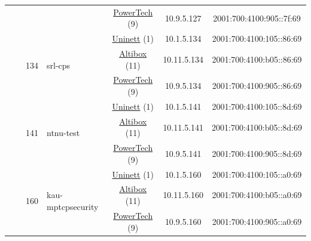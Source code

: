 \begin{small}
\begin{center}
\begin{longtable}{|c|c|c|c|c|c|c|c|}
  &  &  &  & \multicolumn{2}{|c|}{\tiny{\href{http://www.powertech.no}{PowerTech} (9)}} & \tiny{10.9.5.127} & \tiny{2001:700:4100:905::7f:69} \\* \cline{3-3}\cline{4-4}\cline{5-5}\cline{6-6}\cline{7-7}\cline{8-8}
  &  & \multirow{3}{*}{\tiny{134}} & \multicolumn{1}{|l|}{\multirow{3}{*}{\tiny{srl-cps}}} & \multicolumn{2}{|c|}{\tiny{\href{https://www.uninett.no}{Uninett} (1)}} & \tiny{10.1.5.134} & \tiny{2001:700:4100:105::86:69} \\* \cline{5-5}\cline{6-6}\cline{7-7}\cline{8-8}
  &  &  &  & \multicolumn{2}{|c|}{\tiny{\href{https://www.altibox.no}{Altibox} (11)}} & \tiny{10.11.5.134} & \tiny{2001:700:4100:b05::86:69} \\* \cline{5-5}\cline{6-6}\cline{7-7}\cline{8-8}
  &  &  &  & \multicolumn{2}{|c|}{\tiny{\href{http://www.powertech.no}{PowerTech} (9)}} & \tiny{10.9.5.134} & \tiny{2001:700:4100:905::86:69} \\* \cline{3-3}\cline{4-4}\cline{5-5}\cline{6-6}\cline{7-7}\cline{8-8}
  &  & \multirow{3}{*}{\tiny{141}} & \multicolumn{1}{|l|}{\multirow{3}{*}{\tiny{ntnu-test}}} & \multicolumn{2}{|c|}{\tiny{\href{https://www.uninett.no}{Uninett} (1)}} & \tiny{10.1.5.141} & \tiny{2001:700:4100:105::8d:69} \\* \cline{5-5}\cline{6-6}\cline{7-7}\cline{8-8}
  &  &  &  & \multicolumn{2}{|c|}{\tiny{\href{https://www.altibox.no}{Altibox} (11)}} & \tiny{10.11.5.141} & \tiny{2001:700:4100:b05::8d:69} \\* \cline{5-5}\cline{6-6}\cline{7-7}\cline{8-8}
  &  &  &  & \multicolumn{2}{|c|}{\tiny{\href{http://www.powertech.no}{PowerTech} (9)}} & \tiny{10.9.5.141} & \tiny{2001:700:4100:905::8d:69} \\* \cline{3-3}\cline{4-4}\cline{5-5}\cline{6-6}\cline{7-7}\cline{8-8}
  &  & \multirow{3}{*}{\tiny{160}} & \multicolumn{1}{|l|}{\multirow{3}{*}{\tiny{kau-mptcpsecurity}}} & \multicolumn{2}{|c|}{\tiny{\href{https://www.uninett.no}{Uninett} (1)}} & \tiny{10.1.5.160} & \tiny{2001:700:4100:105::a0:69} \\* \cline{5-5}\cline{6-6}\cline{7-7}\cline{8-8}
  &  &  &  & \multicolumn{2}{|c|}{\tiny{\href{https://www.altibox.no}{Altibox} (11)}} & \tiny{10.11.5.160} & \tiny{2001:700:4100:b05::a0:69} \\* \cline{5-5}\cline{6-6}\cline{7-7}\cline{8-8}
  &  &  &  & \multicolumn{2}{|c|}{\tiny{\href{http://www.powertech.no}{PowerTech} (9)}} & \tiny{10.9.5.160} & \tiny{2001:700:4100:905::a0:69} \\* \cline{3-3}\cline{4-4}\cline{5-5}\cline{6-6}\cline{7-7}\cline{8-8}

\end{longtable}
\end{center}
\end{small}
